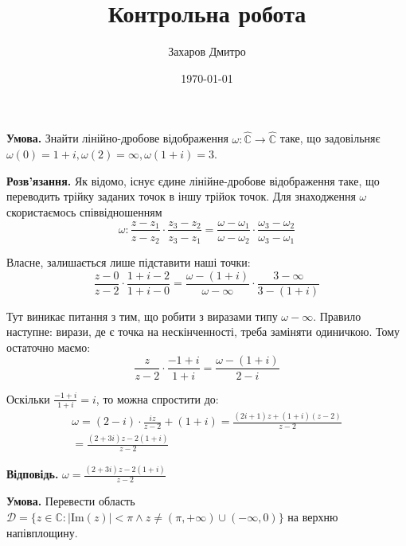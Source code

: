 \documentclass[oneside,solution]{karazin-complan-assign}
\title{Контрольна робота}
\author{Захаров Дмитро}
\date{\today}
\begin{document}
\maketitle



\hspace{20px}\textbf{Умова.} Знайти лінійно-дробове відображення $\omega: \hat{\mathbb{C}} \to \hat{\mathbb{C}}$ таке, що задовільняє $\omega(0)=1+i, \omega(2)=\infty, \omega(1+i)=3$.

\textbf{Розв'язання.} Як відомо, існує єдине лінійне-дробове відображення таке, що переводить трійку заданих точок в іншу трійок точок. Для знаходження $\omega$ скористаємось співвідношенням
\begin{equation}
    \omega: \frac{z-z_1}{z-z_2} \cdot \frac{z_3-z_2}{z_3-z_1} = \frac{\omega - \omega_1}{\omega - \omega_2} \cdot \frac{\omega_3-\omega_2}{\omega_3-\omega_1}
\end{equation}

Власне, залишається лише підставити наші точки:
\begin{equation}
    \frac{z-0}{z-2} \cdot \frac{1+i-2}{1+i-0} = \frac{\omega - (1+i)}{\omega - \infty} \cdot \frac{3-\infty}{3-(1+i)}
\end{equation}

Тут виникає питання з тим, що робити з виразами типу $\omega-\infty$. Правило наступне: вирази, де є точка на нескінченності, треба заміняти одиничкою. Тому остаточно маємо:
\begin{equation}
    \frac{z}{z-2} \cdot \frac{-1+i}{1+i} = \frac{\omega - (1+i)}{2-i}
\end{equation}

Оскільки $\frac{-1+i}{1+i} = i$, то можна спростити до:
\begin{gather}
    \omega = (2-i) \cdot \frac{iz}{z-2} + (1 + i) = \frac{(2i+1)z + (1+i)(z-2)}{z-2} \\
    = \boxed{\frac{(2+3i)z-2(1+i)}{z-2}}
\end{gather}

\textbf{Відповідь.} $\omega=\frac{(2+3i)z-2(1+i)}{z-2}$


\hspace{20px}\textbf{Умова.} Перевести область $\mathcal{D} = \{z \in \mathbb{C}: |\text{Im}(z)| < \pi \wedge z \neq (\pi,+\infty) \cup (-\infty,0)\}$ на верхню напівплощину.
\end{document}

